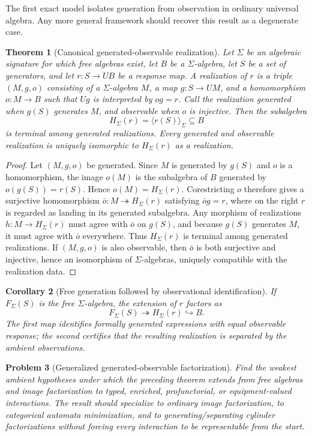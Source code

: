 \documentclass[11pt]{article}
\newtheorem{theorem}{Theorem}[section]
\newtheorem{corollary}[theorem]{Corollary}
\newtheorem{problem}[theorem]{Problem}
\theoremstyle{definition}
\theoremstyle{remark}
\newcommand{\into}{\hookrightarrow}
\newcommand{\onto}{\twoheadrightarrow}
\begin{document}
The first exact model isolates generation from observation in ordinary universal algebra. Any more general framework should recover this result as a degenerate case.

\begin{theorem}[Canonical generated-observable realization]
Let $\Sigma$ be an algebraic signature for which free algebras exist, let $B$ be a $\Sigma$-algebra, let $S$ be a set of generators, and let $r:S\to U B$ be a response map. A realization of $r$ is a triple $(M,g,o)$ consisting of a $\Sigma$-algebra $M$, a map $g:S\to U M$, and a homomorphism $o:M\to B$ such that $Ug$ is interpreted by $o g=r$. Call the realization generated when $g(S)$ generates $M$, and observable when $o$ is injective. Then the subalgebra
\[
H_{\Sigma}(r)=\langle r(S)\rangle_{\Sigma}\subseteq B
\]
is terminal among generated realizations. Every generated and observable realization is uniquely isomorphic to $H_{\Sigma}(r)$ as a realization.
\end{theorem}

\begin{proof}
Let $(M,g,o)$ be generated. Since $M$ is generated by $g(S)$ and $o$ is a homomorphism, the image $o(M)$ is the subalgebra of $B$ generated by $o(g(S))=r(S)$. Hence $o(M)=H_{\Sigma}(r)$. Corestricting $o$ therefore gives a surjective homomorphism $\bar o:M\onto H_{\Sigma}(r)$ satisfying $\bar o g=r$, where on the right $r$ is regarded as landing in its generated subalgebra. Any morphism of realizations $h:M\to H_{\Sigma}(r)$ must agree with $\bar o$ on $g(S)$, and because $g(S)$ generates $M$, it must agree with $\bar o$ everywhere. Thus $H_{\Sigma}(r)$ is terminal among generated realizations. If $(M,g,o)$ is also observable, then $\bar o$ is both surjective and injective, hence an isomorphism of $\Sigma$-algebras, uniquely compatible with the realization data.
\end{proof}

\begin{corollary}[Free generation followed by observational identification]
If $F_{\Sigma}(S)$ is the free $\Sigma$-algebra, the extension of $r$ factors as
\[
F_{\Sigma}(S)\onto H_{\Sigma}(r)\into B.
\]
The first map identifies formally generated expressions with equal observable response; the second certifies that the resulting realization is separated by the ambient observations.
\end{corollary}

\begin{problem}[Generalized generated-observable factorization]
Find the weakest ambient hypotheses under which the preceding theorem extends from free algebras and image factorization to typed, enriched, profunctorial, or equipment-valued interactions. The result should specialize to ordinary image factorization, to categorical automata minimization, and to generating/separating cylinder factorizations without forcing every interaction to be representable from the start.
\end{problem}
\end{document}
